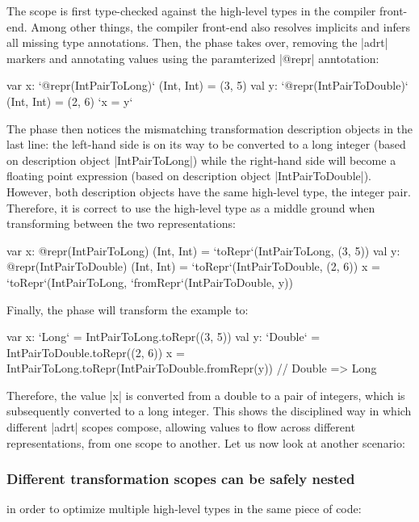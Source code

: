 The scope is first type-checked against the high-level types in the compiler front-end. Among other things, the compiler front-end also resolves implicits and infers all missing type annotations. Then, the  \inject{} phase takes over, removing the |adrt| markers and annotating values using the paramterized |@repr| anntotation:

\begin{lstlisting-nobreak}
var x: `@repr(IntPairToLong)` (Int, Int) = (3, 5)
val y: `@repr(IntPairToDouble)` (Int, Int) = (2, 6)
`x = y`
\end{lstlisting-nobreak}

The \coerce{} phase then notices the mismatching transformation description objects in the last line: the left-hand side is on its way to be converted to a long integer (based on description object |IntPairToLong|) while the right-hand side will become a floating point expression (based on description object |IntPairToDouble|). However, both description objects have the same high-level type, the integer pair. Therefore, it is correct to use the high-level type as a middle ground when transforming between the two representations:

\begin{lstlisting-nobreak}
var x: @repr(IntPairToLong) (Int, Int) = `toRepr`(IntPairToLong, (3, 5))
val y: @repr(IntPairToDouble) (Int, Int) = `toRepr`(IntPairToDouble, (2, 6))
x = `toRepr`(IntPairToLong, `fromRepr`(IntPairToDouble, y))
\end{lstlisting-nobreak}

Finally, the \commit{} phase will transform the example to:

\begin{lstlisting-nobreak}
var x: `Long` = IntPairToLong.toRepr((3, 5))
val y: `Double` = IntPairToDouble.toRepr((2, 6))
x = IntPairToLong.toRepr(IntPairToDouble.fromRepr(y)) // Double => Long
\end{lstlisting-nobreak}

Therefore, the value |x| is converted from a double to a pair of integers, which is subsequently converted to a long integer. This shows the disciplined way in which different |adrt| scopes compose, allowing values to flow across different representations, from one scope to another. Let us now look at another scenario:

\subsubsection{Different transformation scopes can be safely nested} in order to optimize multiple high-level types in the same piece of code:

